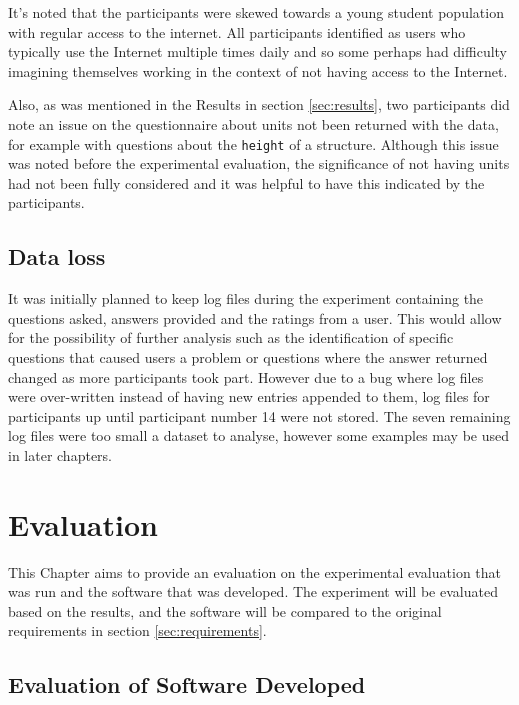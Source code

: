 \documentclass[authoryearcitations]{UoYCSproject}
\begin{document}
It's noted that the participants were skewed towards a young student population with regular access to the internet. All participants identified as users who typically use the Internet multiple times daily and so some perhaps had difficulty imagining themselves working in the context of not having access to the Internet.

Also, as was mentioned in the Results in section \ref{sec:results}, two participants did note an issue on the questionnaire about units not been returned with the data, for example with questions about the \texttt{height} of a structure. Although this issue was noted before the experimental evaluation, the significance of not having units had not been fully considered and it was helpful to have this indicated by the participants.

\section{Data loss}
\label{sec:dataLoss}

It was initially planned to keep log files during the experiment containing the questions asked, answers provided and the ratings from a user. This would allow for the possibility of further analysis such as the identification of specific questions that caused users a problem or questions where the answer returned changed as more participants took part. However due to a bug where log files were over-written instead of having new entries appended to them, log files for participants up until participant number 14 were not stored. The seven remaining log files were too small a dataset to analyse, however some examples may be used in later chapters.

\newpage

\newpage
\chapter{Evaluation}
\label{sec:evaluation}

This Chapter aims to provide an evaluation on the experimental evaluation that was run and the software that was developed. The experiment will be evaluated based on the results, and the software will be compared to the original requirements in section \ref{sec:requirements}.

\section{Evaluation of Software Developed}
\label{sec:evalSoftwareDeveloped}
\end{document}
